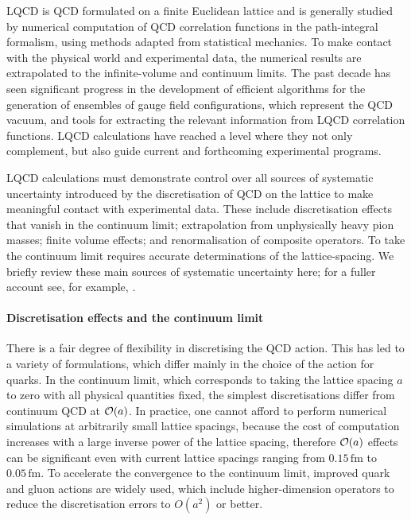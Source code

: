 LQCD is QCD formulated on a finite Euclidean lattice and is generally
studied by numerical computation of QCD correlation functions in the
path-integral formalism, using methods adapted from statistical
mechanics. To make contact with the physical world and experimental
data, the numerical results are extrapolated to the infinite-volume
and continuum limits. The past decade has seen significant progress in
the development of efficient algorithms for the generation of
ensembles of gauge field configurations, which represent the QCD
vacuum, and tools for extracting the relevant information from LQCD
correlation functions. LQCD calculations have reached a level where
they not only complement, but also guide current and forthcoming
experimental programs.

LQCD calculations must demonstrate control over all sources of
systematic uncertainty introduced by the discretisation of QCD on the
lattice to make meaningful contact with experimental data. These
include discretisation effects that vanish in the continuum limit;
extrapolation from unphysically heavy pion masses; finite volume
effects; and renormalisation of composite operators. To take the 
continuum limit requires accurate determinations of the lattice-spacing. 
We briefly review these main sources of systematic
uncertainty here; for a fuller account see, for
example, \cite{Aoki:2016frl}.

\paragraph{Discretisation effects and the continuum limit} There is 
a fair degree of flexibility in discretising the QCD action. This has
led to a variety of formulations, which differ mainly in the choice of
the action for quarks. In the continuum limit, which corresponds to taking
the lattice spacing $a$ to zero with all physical quantities fixed,
the simplest discretisations differ from continuum QCD at ${\cal
O}(a)$. In practice, one cannot afford to perform numerical
simulations at arbitrarily small lattice spacings, because the cost of
computation increases with a large inverse power of the lattice
spacing, therefore ${\cal O}(a)$ effects can be significant even
with current lattice spacings ranging from $0.15 \,\mbox{fm}$ to
$0.05 \,\mbox{fm}$. To accelerate the convergence to the continuum
limit, improved quark and gluon actions are widely used, which include
higher-dimension operators to reduce the discretisation errors to
$O(a^2)$ or better.

